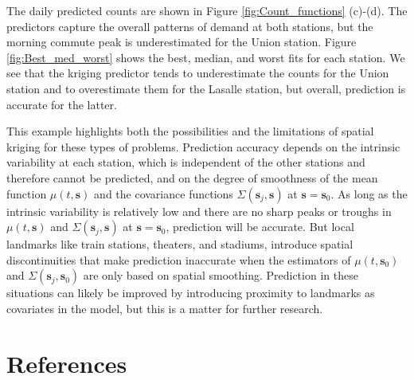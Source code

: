 \documentclass[titlepage,12pt]{article}
\begin{document}

The daily predicted counts are shown in Figure \ref{fig:Count_functions}%
(c)-(d). The predictors capture the overall patterns of demand at both
stations, but the morning commute peak is underestimated for the Union
station. Figure \ref{fig:Best_med_worst} shows the best, median, and worst
fits for each station. We see that the kriging predictor tends to
underestimate the counts for the Union station and to overestimate them for
the Lasalle station, but overall, prediction is accurate for the latter.

This example highlights both the possibilities and the limitations of
spatial kriging for these types of problems. Prediction accuracy depends on
the intrinsic variability at each station, which is independent of the other
stations and therefore cannot be predicted, and on the degree of smoothness
of the mean function $\mu (t,\mathbf{s})$ and the covariance functions $%
\Sigma (\mathbf{s}_{j},\mathbf{s})$ at $\mathbf{s}=\mathbf{s}_{0}$. As long
as the intrinsic variability is relatively low and there are no sharp peaks
or troughs in $\mu (t,\mathbf{s})$ and $\Sigma (\mathbf{s}_{j},\mathbf{s})$
at $\mathbf{s}=\mathbf{s}_{0}$, prediction will be accurate. But local
landmarks like train stations, theaters, and stadiums, introduce spatial
discontinuities that make prediction inaccurate when the estimators of $\mu
(t,\mathbf{s}_{0})$ and $\Sigma (\mathbf{s}_{j},\mathbf{s}_{0})$ are only
based on spatial smoothing. Prediction in these situations can likely be
improved by introducing proximity to landmarks as covariates in the model,
but this is a matter for further research.

\section*{References}
\end{document}
